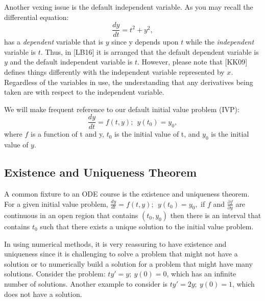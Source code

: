 \documentclass[twoside]{article}
\renewcommand{\cite}[1]{[#1]}
\def\ds{\displaystyle}
\begin{document}
Another vexing issue is the default independent variable. As you may recall the differential equation:
$$\frac {dy}{dt}=t^2+y^2,$$
has a {\it dependent} variable that is $y$ since y depends upon $t$ while the {\it independent} variable is $t$. Thus, in \cite{LB16} it is arranged that the default dependent variable is $y$ and the default independent variable is $t$. However, please note that \cite{KK09} defines things differently with the independent variable represented by $x$. Regardless of the variables in use, the understanding that any derivatives being taken are with respect to the independent variable. 

We will make frequent reference to our default initial value problem (IVP):
$$\frac {dy}{dt} = f(t,y); \ \ y(t_0)=y_0,$$
where $f$ is a function of t and y, $\ds t_0$ is the initial value of t, and $\ds y_0$ is the initial value of $y$.

\subsection{Existence and Uniqueness Theorem}
A common fixture to an ODE course is the existence and uniqueness theorem.
\theorem For a given initial value problem, $\ds \frac {dy}{dt} = f(t,y); \ \ y(t_0)=y_0,$ if $f$ and $\ds \frac {\partial f}{\partial y}$ are continuous in an open region that contains $\ds (t_0,y_0)$ then there is an interval that contains $\ds t_0$ such that there exists a unique solution to the initial value problem. \label{t:existence_uniqueness}

In using numerical methods, it is very reassuring to have existence and uniqueness since it is challenging to solve a problem that might not have a solution or to numerically build a solution for a problem that might have many solutions. Consider the problem: $\ds ty'=y; \ y(0)=0$, which has an infinite number of solutions. Another example to consider is $\ds ty'=2y; \ y(0)=1$, which does not have a solution.  
\end{document}
